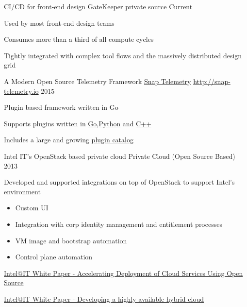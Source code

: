 \begin{cventries}
	\cventry
	{CI/CD for front-end design}
	{GateKeeper}
	{private source}
	{Current}
	{
	\begin{cvitems}
		\item {Used by most front-end design teams}
		\item {Consumes more than a third of all compute cycles}
		\item {Tightly integrated with complex tool flows and the massively distributed design grid}		
	\end{cvitems}
	}

	\cventry
		{A Modern Open Source Telemetry Framework}
		{\href{https://github.com/intelsdi-x/snap}{Snap Telemetry}}
		{\href{http://snap-telemetry.io}{http://snap-telemetry.io}}
		{2015}
		{
		\begin{cvitems}
			\item {Plugin based framework written in Go}
			\item {Supports plugins written in {\color{red}\href{https://github.com/intelsdi-x/snap-plugin-lib-go}{Go}},{\color{red}\href{https://github.com/intelsdi-x/snap-plugin-lib-py}{Python}} and {\color{red}\href{https://github.com/intelsdi-x/snap-plugin-lib-cpp}{C++}}}
			\item {Includes a large and growing {\color{red}\href{http://snap-telemetry.io/plugins.html}{plugin catalog}}}
		\end{cvitems}
		}

	\cventry
		{Intel IT's OpenStack based private cloud}
		{Private Cloud (Open Source Based)}
		{}
		{2013}
		{
		\begin{cvitems}
			\item {Developed and supported integrations on top of OpenStack to support Intel's environment}
			\begin{itemize}
				\item {Custom UI}
				\item {Integration with corp identity management and entitlement processes}
				\item {VM image and bootstrap automation}
				\item {Control plane automation}
			\end{itemize}
			\item {{\color{red}\href{https://software.intel.com/sites/default/files/accelerating-deployment-of-cloud-services-using-open-source-software.pdf}{Intel@IT White Paper - Accelerating Deployment of Cloud Services Using Open Source}}}
			\item {{\color{red}\href{http://www.intel.com/content/dam/www/public/us/en/documents/best-practices/developing-highly-available-dynamic-hybrid-cloud-environment.pdf}{Intel@IT White Paper - Developing a highly available hybrid cloud}}} 
		\end{cvitems}
		}


\end{cventries}
